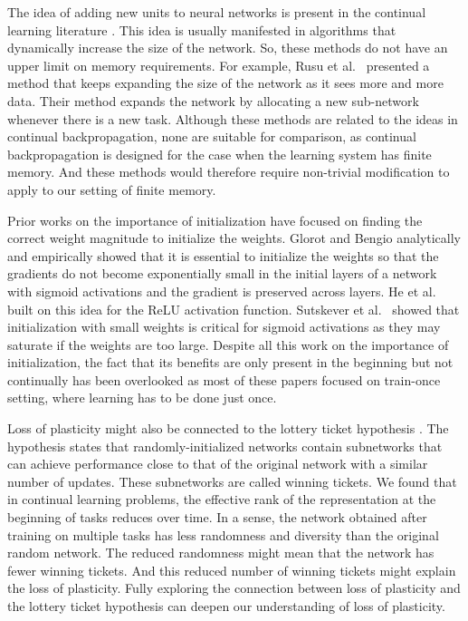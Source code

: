 \documentclass[review, number,3p]{elsarticle}
\begin{document}
The idea of adding new units to neural networks is present in the continual learning literature \cite{zhou2012, rusu2016, yoon2018}. 
This idea is usually manifested in algorithms that dynamically increase the size of the network.
So, these methods do not have an upper limit on memory requirements. 
For example, Rusu et al.\ \cite{rusu2016} presented a method that keeps expanding the size of the network as it sees more and more data. 
Their method expands the network by allocating a new sub-network whenever there is a new task. 
Although these methods are related to the ideas in continual backpropagation, none are suitable for comparison, as continual backpropagation is designed for the case when the learning system has finite memory. 
And these methods would therefore require non-trivial modification to apply to our setting of finite memory.

Prior works on the importance of initialization have focused on finding the correct weight magnitude to initialize the weights. 
Glorot and Bengio \cite{glorot2010understanding} analytically and empirically showed that it is essential to initialize the weights so that the gradients do not become exponentially small in the initial layers of a network with sigmoid activations and the gradient is preserved across layers. 
He et al.\ \cite{he2015delving} built on this idea for the ReLU activation function. 
Sutskever et al.\ \cite{sutskever2013} showed that initialization with small weights is critical for sigmoid activations as they may saturate if the weights are too large. 
Despite all this work on the importance of initialization, the fact that its benefits are only present in the beginning but not continually has been overlooked as most of these papers focused on train-once setting, where learning has to be done just once.


Loss of plasticity might also be connected to the lottery ticket hypothesis \cite{frankle2018the}. 
The hypothesis states that randomly-initialized networks contain subnetworks that can achieve performance close to that of the original network with a similar number of updates. 
These subnetworks are called winning tickets. 
We found that in continual learning problems, the effective rank of the representation at the beginning of tasks reduces over time. 
In a sense, the network obtained after training on multiple tasks has less randomness and diversity than the original random network. 
The reduced randomness might mean that the network has fewer winning tickets. 
And this reduced number of winning tickets might explain the loss of plasticity. 
Fully exploring the connection between loss of plasticity and the lottery ticket hypothesis can deepen our understanding of loss of plasticity.
\end{document}
